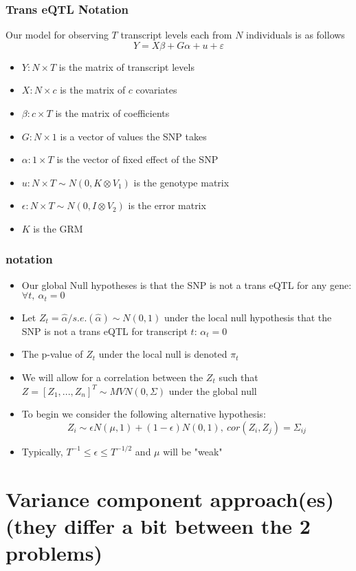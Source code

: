\documentclass{beamer}
\begin{document}
\begin{frame}
\frametitle{Trans eQTL Notation}
Our model for observing $T$ transcript levels each from $N$ individuals is as follows
$$Y=X\beta +G\alpha +u+\varepsilon$$
\begin{itemize}
\item $Y: N\times T$ is the matrix of transcript levels
\item $X: N\times c$ is the matrix of $c$ covariates
\item $\beta: c\times T$ is the matrix of coefficients
\item $G: N\times 1$ is a vector of values the SNP takes
\item $\alpha: 1\times T$ is the vector of fixed effect of the SNP
\item $u: N\times T \sim N(0,K\otimes V_1)$ is the genotype matrix
\item $\epsilon: N\times T\sim N(0,I\otimes V_2)$ is the error matrix
\item $K$ is the GRM
\end{itemize}
\end{frame}

\begin{frame}
\frametitle{notation}
\begin{itemize}
\item Our global Null hypotheses is that the SNP is not a trans eQTL for any gene: $\forall t,\ \alpha_t=0$
\item Let $Z_t=\hat{\alpha}/s.e.(\hat{\alpha})\sim N(0,1)$ under the local null hypothesis that the SNP is not a trans eQTL for transcript $t$: $\alpha_t=0$
\item The p-value of $Z_t$ under the local null is denoted $\pi_t$
\item We will allow for a correlation between the $Z_t$ such that $Z=[Z_1,...,Z_n]^T\sim MVN(0,\Sigma)$ under the global null
\item To begin we consider the following alternative hypothesis:
$$Z_i\sim \epsilon N(\mu,1) + (1-\epsilon)N(0,1),\ cor(Z_i,Z_j)=\Sigma_{ij}$$
\item Typically, $T^{-1}\le\epsilon\le T^{-1/2}$ and $\mu$ will be "weak"
\end{itemize}
\end{frame}

\section{Variance component approach(es) (they differ a bit between the 2 problems) }
\end{document}

